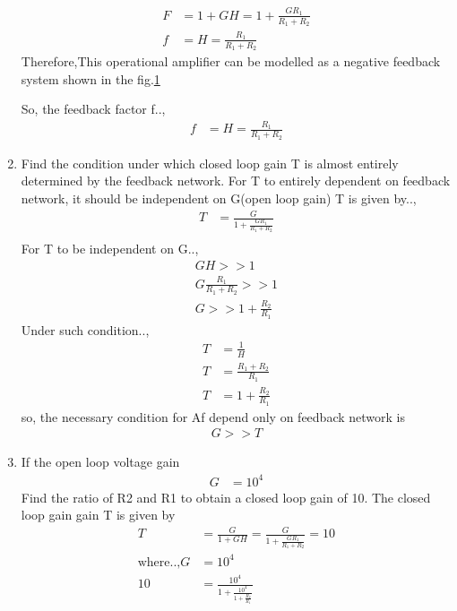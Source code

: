 \begin{enumerate}[label=\thesubsection.\arabic*.,ref=\thesubsection.\theenumi]
\begin{align}
    F &= 1+GH= 1 + \frac{GR_1}{R_1+R_2}\\
    f &= H = \frac{R_1}{R_1+R_2}
\end{align}
Therefore,This operational amplifier can be modelled as a negative feedback system shown in the fig.\ref{fig:equivalent_control_system}
\begin{figure}[!ht]
	\begin{center}
			\resizebox{\columnwidth}{!}{}
	\end{center}
\caption{}
\label{fig:equivalent_control_system}
\end{figure}
So, the feedback factor f..,
\begin{align}
     f &= H = \frac{R_1}{R_1+R_2}
\end{align}
\item Find the condition under which closed loop gain T is almost entirely determined by the feedback network.
\solution For T to entirely dependent on feedback network, it should be independent on G(open loop gain)
T is given by..,
\begin{align}
    T &= \frac{G}{1+\frac{GR_1}{R_1+R_2}} \\
\end{align}
For T to be independent on G..,
\begin{align}
 GH >> 1 \\
 G\frac{R_1}{R_1+R_2} >> 1 \\
 G >> 1 + \frac{R_2}{R_1} 
\end{align}
Under such condition..,
\begin{align}
    T &= \frac{1}{H} \\
    T &= \frac{R_1+R_2}{R_1}\\
    T &= 1+\frac{R_2}{R_1}
\end{align}
so, the necessary condition for Af depend only on feedback network is
\begin{align}
    G >> T
\end{align}
\item If the open loop voltage gain
\begin{align} 
G & = 10^4
\end{align}
Find the ratio of R2 and R1 to obtain a closed loop gain of 10.
\solution The closed loop gain gain T is given by
\begin{align}
    T &= \frac{G}{1+GH}
        = \frac{G}{1+\frac{GR_1}{R_1+R_2}} = 10\\
    \text{where..,} G &= 10^4 \\
    10 &= \frac{10^4}{1+\frac{10^4}{1+\frac{R_2}{R_1}}}\\

\end{align}
\end{enumerate}
